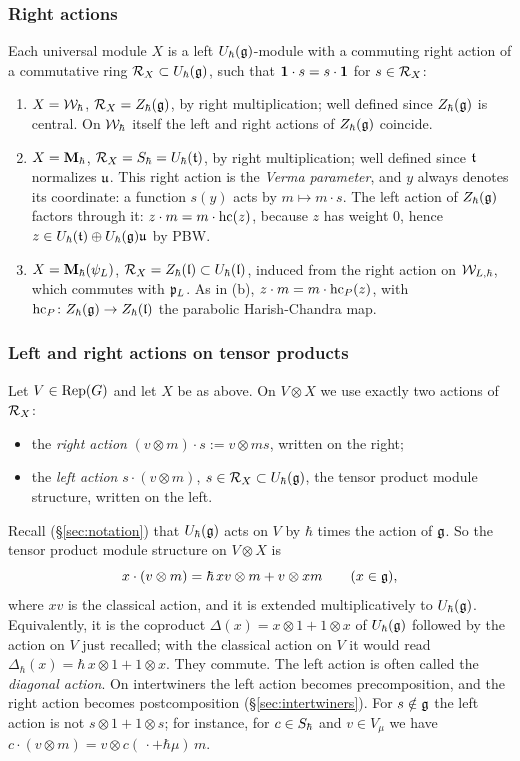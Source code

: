\documentclass{article}
\theoremstyle{plain}
\theoremstyle{definition}
\theoremstyle{remark}
\numberwithin{equation}{section}
\begin{document}
\subsubsection{Right actions}\label{sec:right-actions}
Each universal module $X$ is a left $U_\hbar(\mathfrak{g})$-module with a commuting right action of a commutative ring $\mathcal R_X\subset U_\hbar(\mathfrak{g})$, such that $\mathbf 1\cdot s=s\cdot\mathbf 1$ for $s\in\mathcal R_X$:
\begin{enumerate}[label=(\alph*)]
\item $X=\mathcal{W}_\hbar$, $\mathcal R_X=Z_\hbar(\mathfrak{g})$, by right multiplication; well defined since $Z_\hbar(\mathfrak{g})$ is central. On $\mathcal{W}_\hbar$ itself the left and right actions of $Z_\hbar(\mathfrak{g})$ coincide.
\item $X=\mathbf{M}_\hbar$, $\mathcal R_X=S_\hbar=U_\hbar(\mathfrak{t})$, by right multiplication; well defined since $\mathfrak{t}$ normalizes $\mathfrak{u}$. This right action is the \emph{Verma parameter}, and $y$ always denotes its coordinate: a function $s(y)$ acts by $m\mapsto m\cdot s$. The left action of $Z_\hbar(\mathfrak{g})$ factors through it: $z\cdot m=m\cdot\operatorname{hc}(z)$, because $z$ has weight $0$, hence $z\in U_\hbar(\mathfrak{t})\oplus U_\hbar(\mathfrak{g})\mathfrak{u}$ by PBW.
\item $X=\mathbf{M}_\hbar(\psi_L)$, $\mathcal R_X=Z_\hbar(\mathfrak{l})\subset U_\hbar(\mathfrak{l})$, induced from the right action on $\mathcal{W}_{L,\hbar}$, which commutes with $\mathfrak{p}_L$. As in (b), $z\cdot m=m\cdot\operatorname{hc}_P(z)$, with $\operatorname{hc}_P\colon Z_\hbar(\mathfrak{g})\to Z_\hbar(\mathfrak{l})$ the parabolic Harish-Chandra map.
\end{enumerate}

\subsubsection{Left and right actions on tensor products}\label{sec:left-action}
Let $V\in\operatorname{Rep}(G)$ and let $X$ be as above. On $V\otimes X$ we use exactly two actions of $\mathcal R_X$:
\begin{itemize}
\item the \emph{right action} $(v\otimes m)\cdot s:=v\otimes ms$, written on the right;
\item the \emph{left action} $s\cdot(v\otimes m)$, $s\in\mathcal R_X\subset U_\hbar(\mathfrak{g})$, the tensor product module structure, written on the left.
\end{itemize}
Recall (\S\ref{sec:notation}) that $U_\hbar(\mathfrak{g})$ acts on $V$ by $\hbar$ times the action of $\mathfrak{g}$. So the tensor product module structure on $V\otimes X$ is
\[
x\cdot(v\otimes m)=\hbar\,xv\otimes m+v\otimes xm\qquad(x\in\mathfrak{g}),
\]
where $xv$ is the classical action, and it is extended multiplicatively to $U_\hbar(\mathfrak{g})$. Equivalently, it is the coproduct $\Delta(x)=x\otimes1+1\otimes x$ of $U_\hbar(\mathfrak{g})$ followed by the action on $V$ just recalled; with the classical action on $V$ it would read $\Delta_\hbar(x)=\hbar\,x\otimes1+1\otimes x$.
They commute. The left action is often called the \emph{diagonal action}. On intertwiners the left action becomes precomposition, and the right action becomes postcomposition (\S\ref{sec:intertwiners}). For $s\notin\mathfrak{g}$ the left action is not $s\otimes1+1\otimes s$; for instance, for $c\in S_\hbar$ and $v\in V_\mu$ we have $c\cdot(v\otimes m)=v\otimes c(\,\cdot+\hbar\mu)\,m$.
\end{document}
